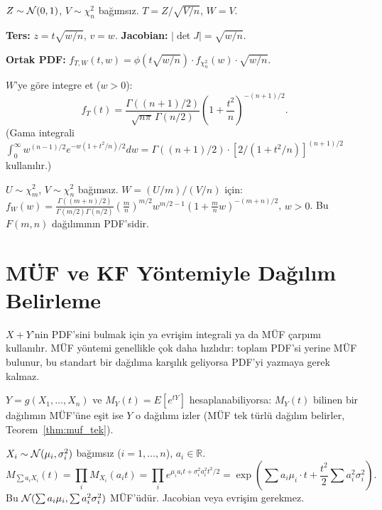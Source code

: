 \begin{ornek}
\label{ex:t_turetme}
$Z \sim \mathcal{N}(0,1)$, $V \sim \chi^2_n$ bağımsız. $T = Z/\sqrt{V/n}$, $W = V$.

\textbf{Ters:} $z = t\sqrt{w/n}$, $v = w$.
\textbf{Jacobian:} $|\det J| = \sqrt{w/n}$.

\textbf{Ortak PDF:}
$f_{T,W}(t,w) = \phi(t\sqrt{w/n}) \cdot f_{\chi^2_n}(w) \cdot \sqrt{w/n}$.

$W$'ye göre integre et ($w > 0$):
\[
  f_T(t) = \frac{\Gamma((n+1)/2)}{\sqrt{n\pi}\,\Gamma(n/2)} \left(1 + \frac{t^2}{n}\right)^{-(n+1)/2}.
\]
(Gama integrali $\int_0^\infty w^{(n-1)/2} e^{-w(1+t^2/n)/2} dw = \Gamma((n+1)/2) \cdot [2/(1+t^2/n)]^{(n+1)/2}$
kullanılır.)
\end{ornek}

\begin{ornek}
$U \sim \chi^2_m$, $V \sim \chi^2_n$ bağımsız. $W = (U/m)/(V/n)$ için:
$f_W(w) = \frac{\Gamma((m+n)/2)}{\Gamma(m/2)\Gamma(n/2)} \left(\frac{m}{n}\right)^{m/2}
w^{m/2-1}\left(1 + \frac{m}{n}w\right)^{-(m+n)/2}$, $w > 0$.
Bu $F(m,n)$ dağılımının PDF'sidir.
\end{ornek}

\section{MÜF ve KF Yöntemiyle Dağılım Belirleme}
\label{sec:muf_yontemi}

\begin{motivasyon}
$X+Y$'nin PDF'sini bulmak için ya evrişim integrali ya da MÜF çarpımı kullanılır.
MÜF yöntemi genellikle çok daha hızlıdır: toplam PDF'si yerine MÜF bulunur,
bu standart bir dağılıma karşılık geliyorsa PDF'yi yazmaya gerek kalmaz.
\end{motivasyon}

\begin{teorem}
\label{thm:muf_tanim}
$Y = g(X_1, \ldots, X_n)$ ve $M_Y(t) = E[e^{tY}]$ hesaplanabiliyorsa:
$M_Y(t)$ bilinen bir dağılımın MÜF'üne eşit ise $Y$ o dağılımı izler
(MÜF tek türlü dağılım belirler, Teorem~\ref{thm:muf_tek}).
\end{teorem}

\begin{ornek}
$X_i \sim \mathcal{N}(\mu_i, \sigma_i^2)$ bağımsız ($i=1,\ldots,n$), $a_i \in \mathbb{R}$.
\[
  M_{\sum a_i X_i}(t) = \prod_i M_{X_i}(a_i t) = \prod_i e^{\mu_i a_i t + \sigma_i^2 a_i^2 t^2/2}
  = \exp\!\left(\sum a_i\mu_i \cdot t + \frac{t^2}{2}\sum a_i^2\sigma_i^2\right).
\]
Bu $\mathcal{N}(\sum a_i\mu_i, \sum a_i^2\sigma_i^2)$ MÜF'üdür. Jacobian veya evrişim gerekmez.
\end{ornek}

